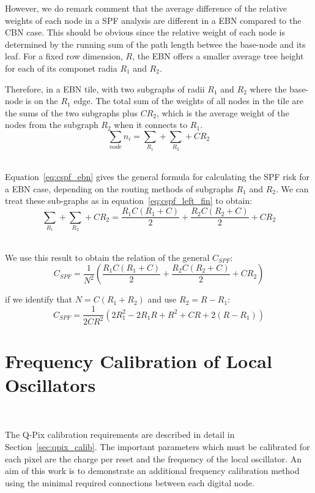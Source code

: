 However, we do remark comment that the average difference of the relative weights of each node in a SPF analysis are different in a EBN compared to the CBN case.
This should be obvious since the relative weight of each node is determined by the running sum of the path length betwee the base-node and its leaf.
For a fixed row dimension, $R$, the EBN offers a smaller average tree height for each of its componet radia $R_{1}$ and $R_{2}$.

Therefore, in a EBN tile, with two subgraphs of radii $R_{1}$ and $R_{2}$ where the base-node is on the $R_{1}$ edge.
The total sum of the weights of all nodes in the tile are the sums of the two subgraphs plus $CR_{2}$, which is the average weight of the nodes from the subgraph $R_{2}$ when it connects to $R_{1}$.
\begin{equation}
  \sum_{node}n_{i} = \sum_{R_{1}} + \sum_{R_{2}} + CR_{2}
\end{equation}~\label{eq:cspf_ebn}

Equation~\ref{eq:cspf_ebn} gives the general formula for calculating the SPF risk for a EBN case, depending on the routing methods of subgraphs $R_{1}$ and $R_{2}$.
We can treat these sub-graphs as in equation~\ref{eq:cspf_left_fin} to obtain:
\begin{equation}
  \sum_{R_{1}} + \sum_{R_{2}} + CR_{2} = \frac{R_{1}C(R_{1}+C)}{2} + \frac{R_{2}C(R_{2}+C)}{2} + CR_{2}
\end{equation}~\label{eq:cspf_e}

We use this result to obtain the relation of the general $C_{SPF}$:
\begin{equation}
  C_{SPF} = \frac{1}{N^{2}}(\frac{R_{1}C(R_{1}+C)}{2} + \frac{R_{2}C(R_{2}+C)}{2} + CR_{2})
\end{equation}

if we identify that $N = C(R_{1}+R_{2})$ and use $R_{2} = R - R_{1}$:
\begin{equation}
  C_{SPF} = \frac{1}{2CR^{2}}(2R_{1}^{2}-2R_{1}R+R^{2}+CR+2(R-R_{1}))
\end{equation}


\section{Frequency Calibration of Local Oscillators}~\label{sec:calib}

The Q-Pix calibration requirements are described in detail in Section~\ref{sec:qpix_calib}.
The important parameters which must be calibrated for each pixel are the charge per reset and the frequency of the local oscillator.
An aim of this work is to demonstrate an additional frequency calibration method using the minimal required connections between each digital node.

